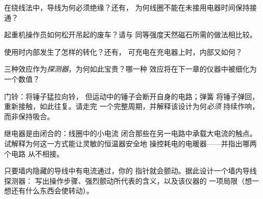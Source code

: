 \begin{exercise}[$\star$]\label{exo:g8:electric-current-effects:5}
在绕线法中，导线为何必须绝缘？还有，
为何线圈不能在未接用电器时间保持接通？
\end{exercise}

\begin{exercise}[$\star$]\label{exo:g8:electric-current-effects:6}
起重机操作员如何松开吊起的废车？请与
同等强度天然磁石所需的做法相比较。
\end{exercise}

\begin{exercise}[$\star$]\label{exo:g8:electric-current-effects:7}
使用时内部发生了怎样的转化？还有，
可充电在充电器上时，内部又如何？
\end{exercise}

\begin{exercise}[$\star$]\label{exo:g8:electric-current-effects:8}
三种效应作为\emph{探测器}，为何如此宝贵？哪一种
效应将在下一章的仪器中被细化为
一个数值？
\end{exercise}

\begin{exercise}[$\star\star$]\label{exo:g8:electric-current-effects:9}
门铃：将锤子猛拉向铃，
但运动中的锤子会断开自身的电路；弹簧
将锤子弹回，重新接触，如此往复。请走完
一个完整周期，并解释该设计为何\emph{必须}
持续作响，而非保持吸合。
\end{exercise}

\begin{exercise}[$\star\star$]\label{exo:g8:electric-current-effects:10}
继电器是由闭合的：线圈中的小电流
闭合那些在另一电路中承载大电流的触点。
试解释为何这一方式能让灵敏的恒温器安全地
操控耗电的电暖器——并指出哪两个电路
从不相接。
\end{exercise}

\begin{exercise}[$\star\star$]\label{exo:g8:electric-current-effects:11}
只要墙内隐藏的导线中有电流通过，你的
指针就会颤动。据此设计一个墙内导线探测器：
写出操作步骤、强烈颤动所代表的含义，以及该仪器的
一项局限（想一想还有什么东西会使转动）。
\end{exercise}

